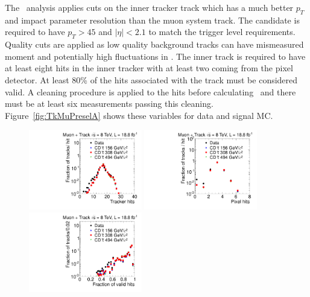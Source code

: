 The \tktof\ analysis applies cuts on the inner tracker track which has a much better $p_T$ and impact parameter resolution than the muon system track.
The candidate is required to have $p_T > 45$ and  $|\eta| < 2.1$ to match the trigger level requirements. 
Quality cuts are applied as low quality background tracks can have mismeasured moment and potentially high fluctuations in \dedx.
The inner track is required to have at least eight hits in the inner tracker with at least two coming from the pixel detector. At least 80\% of the hits associated with the track
must be considered valid. A cleaning procedure is applied to the hits before calculating \dedx\ and there must be at least six measurements passing this cleaning.
Figure~\ref{fig:TkMuPreselA} shows these variables for data and signal MC.

\begin{figure}
\centering
  \includegraphics[clip=true, trim=0.0cm 0cm 2.8cm 0cm, width=0.44\textwidth]{figures/tkmu/Selection_Comp_8TeV_GMStau_NOH_BS}
  \includegraphics[clip=true, trim=0.0cm 0cm 2.8cm 0cm, width=0.44\textwidth]{figures/tkmu/Selection_Comp_8TeV_GMStau_NOPH_BS} \\
  \includegraphics[clip=true, trim=0.0cm 0cm 2.8cm 0cm, width=0.44\textwidth]{figures/tkmu/Selection_Comp_8TeV_GMStau_NOHFraction_BS}

\end{figure}
